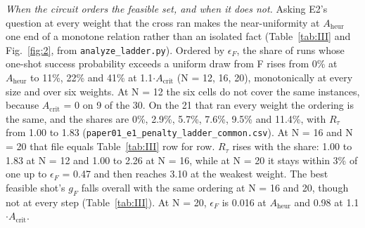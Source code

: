 \documentclass{ieeeaccess}
\begin{document}
\begin{table}[!t]
\end{table}


\textit{When the circuit orders the feasible set, and when it does not.} Asking E2's question at every weight that the cross ran makes the near-uniformity at $A_{\mathrm{heur}}$ one end of a monotone relation rather than an isolated fact (Table~\ref{tab:III} and Fig.~\ref{fig:2}, from \texttt{analyze\_ladder.py}). Ordered by $\epsilon_{F}$, the share of runs whose one-shot success probability exceeds a uniform draw from F rises from 0\% at $A_{\mathrm{heur}}$ to 11\%, 22\% and 41\% at 1.1$\cdot$$A_{\mathrm{crit}}$ (N = 12, 16, 20), monotonically at every size and over six weights. At N = 12 the six cells do not cover the same instances, because $A_{\mathrm{crit}}$ = 0 on 9 of the 30. On the 21 that ran every weight the ordering is the same, and the shares are 0\%, 2.9\%, 5.7\%, 7.6\%, 9.5\% and 11.4\%, with $R_{\tau}$ from 1.00 to 1.83 (\texttt{paper01\_e1\_penalty\_ladder\_common.csv}). At N = 16 and N = 20 that file equals Table~\ref{tab:III} row for row. $R_{\tau}$ rises with the share: 1.00 to 1.83 at N = 12 and 1.00 to 2.26 at N = 16, while at N = 20 it stays within 3\% of one up to $\epsilon_{F}$ = 0.47 and then reaches 3.10 at the weakest weight. The best feasible shot's $g_{F}$ falls overall with the same ordering at N = 16 and 20, though not at every step (Table~\ref{tab:III}). At N = 20, $\epsilon_{F}$ is 0.016 at $A_{\mathrm{heur}}$ and 0.98 at 1.1$\cdot$$A_{\mathrm{crit}}$.
\end{document}
